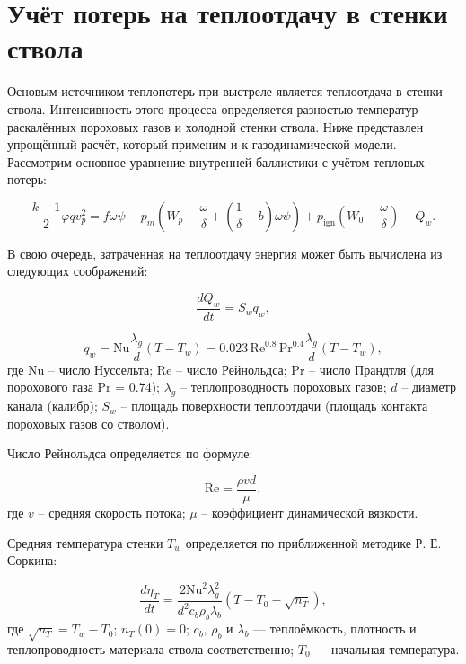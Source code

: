 \documentclass[14pt, a4paper]{report} %
\begin{document}
\section{Учёт потерь на теплоотдачу в стенки ствола}

Основым источником теплопотерь при выстреле является теплоотдача в стенки ствола. Интенсивность этого процесса определяется разностью температур раскалённых пороховых газов и холодной стенки ствола. Ниже представлен упрощённый расчёт, который применим и к газодинамической модели.
Рассмотрим основное уравнение внутренней баллистики с учётом тепловых потерь:

\begin{equation}
\frac{k-1}{2} \varphi q v_p^2 = f \omega \psi - p_m \left( W_p - \frac{\omega}{\delta} + \left( \frac{1}{\delta} - b \right) \omega \psi \right) + p_{\text{ign}} \left( W_0 - \frac{\omega}{\delta} \right) - Q_w.
\end{equation}

В свою очередь, затраченная на теплоотдачу энергия может быть вычислена из следующих соображений:

\begin{equation}
\frac{dQ_{w}}{dt} = S_{w} q_{w},
\end{equation}

\begin{equation}
q_{w} = \mathrm{Nu} \frac{\lambda_g}{d} (T - T_{w}) = 0.023 \, \mathrm{Re}^{0.8} \, \mathrm{Pr}^{0.4} \frac{\lambda_g}{d} (T - T_{w}),
\end{equation}
где Nu -- число Нуссельта; Re -- число Рейнольдса; Pr -- число Прандтля (для порохового газа Pr = 0.74); $\lambda_g$ -- теплопроводность пороховых газов; $d$ -- диаметр канала (калибр); $S_w$ -- площадь поверхности теплоотдачи (площадь контакта пороховых газов со стволом).

Число Рейнольдса определяется по формуле:

\begin{equation}
\mathrm{Re} = \frac{\rho v d}{\mu},
\end{equation}
где $v$ -- средняя скорость потока; $\mu$ -- коэффициент динамической вязкости.
 
Средняя температура стенки \( T_w \) определяется по приближенной методике Р. Е. Соркина:

\begin{equation}
\frac{d\eta_T}{dt} = \frac{2 \mathrm{Nu}^2 \lambda_g^2}{d^2 c_b \rho_b \lambda_b} \left( T - T_0 - \sqrt{n_T} \right),
\end{equation}
где \( \sqrt{n_T} = T_w - T_0 \); \( n_T(0) = 0 \); \( c_b, \, \rho_b \) и \( \lambda_b \) — теплоёмкость, плотность и теплопроводность материала ствола соответственно; \( T_0 \) — начальная температура.
\end{document}
